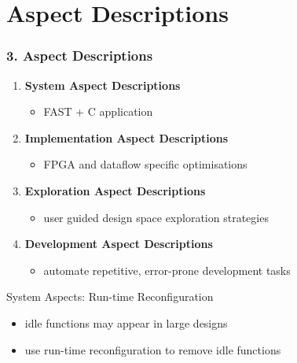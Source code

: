 \section{Aspect Descriptions}
\begin{frame}
  \frametitle{3. Aspect Descriptions}
  \begin{enumerate}
    \setlength{\itemsep}{15pt}
  \item \textbf{System Aspect Descriptions}
    \begin{itemize}
    \item FAST + C application
    \end{itemize}
  \item \textbf{Implementation Aspect Descriptions}
    \begin{itemize}
    \item FPGA and dataflow specific optimisations
    \end{itemize}
  \item \textbf{Exploration Aspect Descriptions}
    \begin{itemize}
    \item user guided design space exploration strategies
    \end{itemize}
  \item \textbf{Development Aspect Descriptions}
    \begin{itemize}
    \item automate repetitive, error-prone development tasks
    \end{itemize}
  \end{enumerate}
\end{frame}

\begin{frame}{System Aspects: Run-time Reconfiguration}
  \begin{itemize}
  \item idle functions may appear in large designs
  \item use run-time reconfiguration to remove idle functions
    \begin{columns}
      \begin{column}{.55\textwidth}
  \begin{figure}[!ht]
    \centering
    \def\svgwidth{\linewidth}
    
  \end{figure}
      \end{column}
      \begin{column}{.45\textwidth}
  \begin{figure}[!ht]
    \centering
    \def\svgwidth{\linewidth}
    
  \end{figure}
      \end{column}
    \end{columns}


  \end{itemize}
\end{frame}

